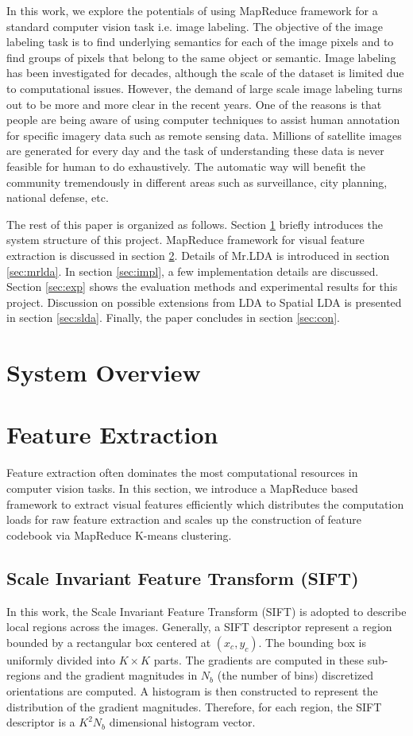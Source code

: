 \documentclass{acm_proc_article-sp}
\begin{document}
In this work, we explore the potentials of using MapReduce framework for a standard computer vision task i.e. image labeling. The objective of the image labeling task is to find underlying semantics for each of the image pixels and to find groups of pixels that belong to the same object or semantic. Image labeling has been investigated for decades, although the scale of the dataset is limited due to computational issues. However, the demand of large scale image labeling turns out to be more and more clear in the recent years. One of the reasons is that people are being aware of using computer techniques to assist human annotation for specific imagery data such as remote sensing data. Millions of satellite images are generated for every day and the task of understanding these data is never feasible for human to do exhaustively. The automatic way will benefit the community tremendously in different areas such as surveillance, city planning, national defense, etc.

The rest of this paper is organized as follows.
Section \ref{sec:overview} briefly introduces the system structure of this project.
MapReduce framework for visual feature extraction is discussed in section \ref{sec:feature}.
Details of Mr.LDA is introduced in section \ref{sec:mrlda}. In section \ref{sec:impl}, a few implementation details are
discussed. Section \ref{sec:exp} shows the evaluation methods and experimental results for this project. Discussion on
possible extensions from LDA to Spatial LDA is presented in section \ref{sec:slda}. Finally, the paper concludes in section \ref{sec:con}.


\section{System Overview}\label{sec:overview}

\section{Feature Extraction}\label{sec:feature}
Feature extraction often dominates the most computational resources in computer vision tasks. In this section, we introduce a MapReduce based framework to extract visual features efficiently which distributes the computation loads for raw feature extraction and scales up the construction of feature codebook via MapReduce K-means clustering.
\subsection{Scale Invariant Feature Transform (SIFT)}
In this work, the Scale Invariant Feature Transform (SIFT) \cite{sift} is adopted to describe local regions across the images. Generally, a SIFT descriptor represent a region bounded by a rectangular box centered at $(x_c,y_c)$. The bounding box is uniformly divided into $K\times K$ parts. The gradients are computed in these sub-regions and the gradient magnitudes in $N_b$ (the number of bins) discretized orientations  are computed. A histogram is then constructed to represent the distribution of the gradient magnitudes. Therefore, for each region, the SIFT descriptor is a $K^2N_b$ dimensional histogram vector.
\end{document}

